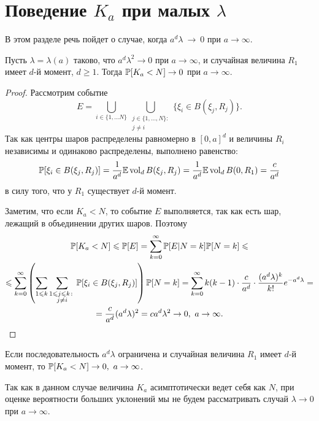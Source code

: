 \section{Поведение $K_a$ при малых $\lambda$}

В этом разделе речь пойдет о случае, когда  $a^d\lambda~\to~0$ при $a\to\infty$.

\begin{thm}
Пусть $\lambda = \lambda(a)$ таково, что $a^d\lambda^2 \to 0$ при $a\to\infty$, и случайная величина $R_1$ имеет $d$-й момент, $d\geq 1$. Тогда $\mathbb{P}[K_a < N] \to 0$ при $a\to\infty$.
\end{thm}

\begin{proof}
Рассмотрим событие $$E =\bigcup_{i\in \{1, \ldots N\}} \bigcup_{\substack{j\in\{1, \ldots, N\}\colon\\ j \not= i}}\{\xi_i\in B(\xi_j, R_j)\}.$$
Так как центры шаров распределены равномерно в $[0, a]^d$ и величины $R_i$ независимы и одинаково распределены, выполнено равенство:
\begin{equation*}
    \mathbb{P}[\xi_i\in B(\xi_j, R_j)] = \dfrac{1}{a^d}\mathbb{E} \operatorname{vol}_d B(\xi_j, R_j) = \dfrac{1}{a^d}\mathbb{E} \operatorname{vol}_d B(0, R_1) = \dfrac{c}{a^d}
\end{equation*}
в силу того, что у $R_1$ существует $d$-й момент.

Заметим, что если $K_a < N$, то событие $E$ выполняется, так как есть шар, лежащий в объединении других шаров. Поэтому 
\begin{multline*}
    \mathbb{P}[K_a < N]\leqslant
    \mathbb{P}[E] =
    \sum_{k=0}^\infty \mathbb{P}[E|N = k]\mathbb{P}[N = k] \leqslant\\
    \leqslant \sum_{k=0}^\infty \left(\sum_{1 \leqslant k}\sum_{\substack{1\leqslant j\leqslant k\colon\\ j\not= i}} \mathbb{P}[\xi_i\in B(\xi_j, R_j)] \right)\mathbb{P}[N = k] = 
    \sum_{k=0}^\infty k(k-1) \cdot\dfrac{c}{a^d}\cdot\dfrac{(a^d\lambda)^k}{k!}e^{-a^d\lambda} = \\
    = \dfrac{c}{a^d}(a^d\lambda)^2 = 
    ca^d\lambda^2 \to 0, \ a\to\infty.
\end{multline*}
\end{proof}

\begin{cor}
Если последовательность $a^d\lambda$ ограничена и случайная величина $R_1$ имеет $d$-й момент, то $\mathbb{P}[K_a < N] \to 0, \ a \to\infty$.
\end{cor}

Так как в данном случае величина $K_a$ асимптотически ведет себя как $N$, при оценке вероятности больших уклонений мы не будем рассматривать случай $\lambda \to 0$ при $a\to \infty$.
